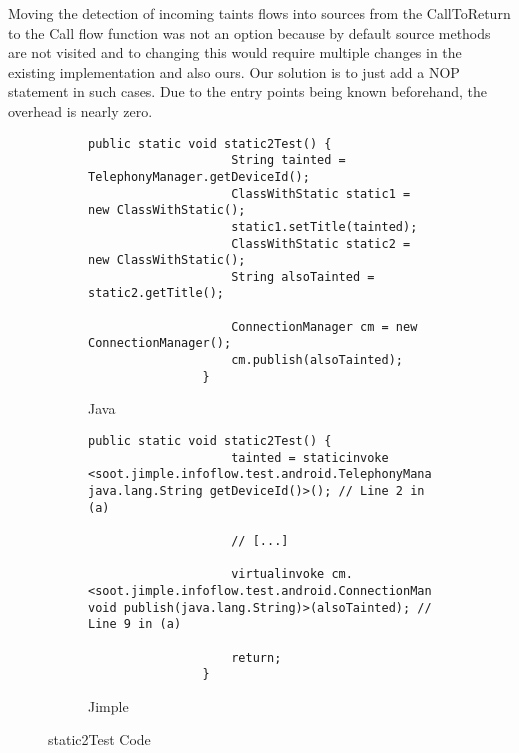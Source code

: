 \documentclass[../draft.tex]{subfiles}
\begin{document}
    Moving the detection of incoming taints flows into sources from the CallToReturn to the Call flow function was not an option because by default source methods are not visited and to changing this would require multiple changes in the existing implementation and also ours. 
    Our solution is to just add a NOP statement in such cases. Due to the entry points being known beforehand, the overhead is nearly zero.

    \begin{figure}[ht]
        \centering
        \begin{subfigure}[b]{\textwidth}
            \begin{lstlisting}[gobble=16]
                public static void static2Test() {
                    String tainted = TelephonyManager.getDeviceId();
                    ClassWithStatic static1 = new ClassWithStatic();
                    static1.setTitle(tainted);
                    ClassWithStatic static2 = new ClassWithStatic();
                    String alsoTainted = static2.getTitle();
                    
                    ConnectionManager cm = new ConnectionManager();
                    cm.publish(alsoTainted);
                }
            \end{lstlisting}
            \caption{Java}
        \end{subfigure}
        \qquad
        \begin{subfigure}[b]{\textwidth}
            \begin{lstlisting}[language=Jimple, gobble=16]
                public static void static2Test() {
                    tainted = staticinvoke <soot.jimple.infoflow.test.android.TelephonyManager: java.lang.String getDeviceId()>(); // Line 2 in (a)

                    // [...]
            
                    virtualinvoke cm.<soot.jimple.infoflow.test.android.ConnectionManager: void publish(java.lang.String)>(alsoTainted); // Line 9 in (a)

                    return;
                }
            \end{lstlisting}
            \caption{Jimple}
        \end{subfigure}
        \caption{static2Test Code}
        \label{lst:static2TestJava}
    \end{figure}
\end{document}
